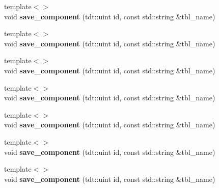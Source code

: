 \begin{DoxyCompactItemize}
\item 
{\footnotesize template$<$$>$ }\\void {\bfseries save\+\_\+component} (tdt\+::uint id, const std\+::string \&tbl\+\_\+name)\hypertarget{class_game_serializer_a2b8f301421ab3d3df49c1b3537ab3b96}{}\label{class_game_serializer_a2b8f301421ab3d3df49c1b3537ab3b96}

\item 
{\footnotesize template$<$$>$ }\\void {\bfseries save\+\_\+component} (tdt\+::uint id, const std\+::string \&tbl\+\_\+name)\hypertarget{class_game_serializer_a2b8f301421ab3d3df49c1b3537ab3b96}{}\label{class_game_serializer_a2b8f301421ab3d3df49c1b3537ab3b96}

\item 
{\footnotesize template$<$$>$ }\\void {\bfseries save\+\_\+component} (tdt\+::uint id, const std\+::string \&tbl\+\_\+name)\hypertarget{class_game_serializer_a2b8f301421ab3d3df49c1b3537ab3b96}{}\label{class_game_serializer_a2b8f301421ab3d3df49c1b3537ab3b96}

\item 
{\footnotesize template$<$$>$ }\\void {\bfseries save\+\_\+component} (tdt\+::uint id, const std\+::string \&tbl\+\_\+name)\hypertarget{class_game_serializer_a2b8f301421ab3d3df49c1b3537ab3b96}{}\label{class_game_serializer_a2b8f301421ab3d3df49c1b3537ab3b96}

\item 
{\footnotesize template$<$$>$ }\\void {\bfseries save\+\_\+component} (tdt\+::uint id, const std\+::string \&tbl\+\_\+name)\hypertarget{class_game_serializer_a2b8f301421ab3d3df49c1b3537ab3b96}{}\label{class_game_serializer_a2b8f301421ab3d3df49c1b3537ab3b96}

\item 
{\footnotesize template$<$$>$ }\\void {\bfseries save\+\_\+component} (tdt\+::uint id, const std\+::string \&tbl\+\_\+name)\hypertarget{class_game_serializer_a2b8f301421ab3d3df49c1b3537ab3b96}{}\label{class_game_serializer_a2b8f301421ab3d3df49c1b3537ab3b96}

\item 
{\footnotesize template$<$$>$ }\\void {\bfseries save\+\_\+component} (tdt\+::uint id, const std\+::string \&tbl\+\_\+name)\hypertarget{class_game_serializer_a2b8f301421ab3d3df49c1b3537ab3b96}{}\label{class_game_serializer_a2b8f301421ab3d3df49c1b3537ab3b96}


\end{DoxyCompactItemize}
